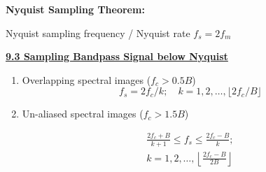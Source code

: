\documentclass[landscape,a4paper]{extarticle}
\newenvironment{Figure}
  {\noindent\minipage{\linewidth}}
  {\endminipage\par\medskip}
\begin{document}
\begin{multicols*}{5}


    \textbf{Nyquist Sampling Theorem:}

    Nyquist sampling frequency / Nyquist rate $f_s = 2 f_m$

    \textbf{\uline{9.3 Sampling Bandpass Signal below Nyquist}}

    \begin{enumerate}[label=(\alph*)]
        \item Overlapping spectral images ($f_c > 0.5B$)
        \[
            f_s = 2f_c / k; \quad k = 1,2,\ldots, \lfloor 2f_c/B \rfloor \tag{9.2a}
        \]
        \item Un-aliased spectral images ($f_c > 1.5B$)

        \[
            \begin{split}
                \frac{2f_c + B}{k + 1} \leq f_s \leq \frac{2f_c - B}{k};\\
                k = 1,2,\ldots,\left\lfloor \frac{2f_c - B}{2B} \right\rfloor
            \end{split} \tag{9.2b}
        \]
    \end{enumerate}
\end{multicols*}
\end{document}
